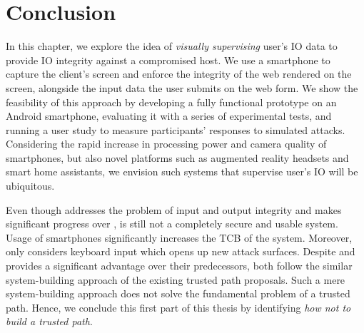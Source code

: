 \section{Conclusion} 
\label{integriscreen:sec:conclusion}

In this chapter, we explore the idea of \emph{visually supervising} user's IO data to provide IO integrity against a compromised host. We use a smartphone to capture the client's screen and enforce the integrity of the web rendered on the screen, alongside the input data the user submits on the web form. We show the feasibility of this approach by developing a fully functional prototype on an Android smartphone, evaluating it with a series of experimental tests, and running a user study to measure participants' responses to simulated attacks.
Considering the rapid increase in processing power and camera quality of smartphones, but also novel platforms such as augmented reality headsets and smart home assistants, we envision such systems that supervise user's IO will be ubiquitous.

Even though \integriscreen addresses the problem of input and output integrity and makes significant progress over \integriscreen, \integriscreen is still not a completely secure and usable system. Usage of smartphones significantly increases the TCB of the system. Moreover, \integriscreen only considers keyboard input which opens up new attack surfaces. Despite \integrikey and \integriscreen provides a significant advantage over their predecessors, both follow the similar system-building approach of the existing trusted path proposals. Such a mere system-building approach does not solve the fundamental problem of a trusted path. Hence, we conclude this first part of this thesis by identifying \emph{how not to build a trusted path}. 